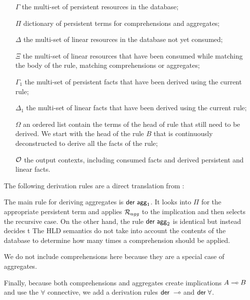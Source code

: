 \begin{enumerate}

   \item[$\Gamma$] the multi-set of persistent resources in the database;
   
   \item[$\Pi$] dictionary of persistent terms for comprehensions and
   aggregates;

   \item[$\Delta$] the multi-set of linear resources in the database not yet
   consumed;

   \item[$\Xi$] the multi-set of linear resources that have been consumed while
   matching the body of the rule, matching comprehensions or aggregates;

   \item[$\Gamma_1$] the multi-set of persistent facts that have been derived
   using the current rule;

   \item[$\Delta_1$] the multi-set of linear facts that have been derived using
   the current rule;

   \item[$\Omega$] an ordered list contain the terms of the head of rule that
   still need to be derived. We start with the head of the rule $B$ that is
   continuously deconstructed to derive all the facts of the rule;

   \item[$\mathcal{O}$] the output contexts, including consumed facts and derived
   persistent and linear facts.

\end{enumerate}

The following derivation rules are a direct translation from \fragment:



The main rule for deriving aggregates is $\mathsf{der} \; \mathsf{agg}_1$. It looks into $\Pi$
for the appropriate persistent term and applies $\mathcal{R}_{agg}$ to the implication
and then selects the recursive case. On the other hand, the rule $\mathsf{der} \;
\mathsf{agg}_2$ is identical but instead decides t
The HLD
semantics do not take into account the contents of the database to determine how
many times a comprehension should be applied.



We do not include comprehensions here because they are a special case of
aggregates.

Finally, because both comprehensions and aggregates create implications $A \multimap
B$ and use the $\forall$ connective, we add a derivation rules $\mathsf{der} \; \multimap$
and $\mathsf{der} \; \forall$.


